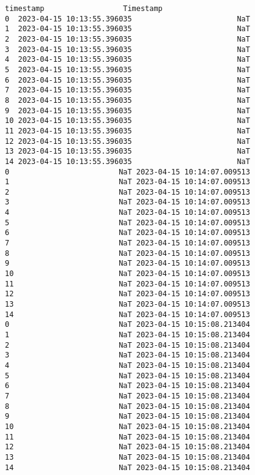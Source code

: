 \documentclass[11pt]{article}
\begin{document}
\begin{tcolorbox}[breakable, size=fbox, boxrule=.5pt, pad at break*=1mm, opacityfill=0]
\begin{Verbatim}[commandchars=\\\{\}]
                    timestamp                  Timestamp
0  2023-04-15 10:13:55.396035                        NaT
1  2023-04-15 10:13:55.396035                        NaT
2  2023-04-15 10:13:55.396035                        NaT
3  2023-04-15 10:13:55.396035                        NaT
4  2023-04-15 10:13:55.396035                        NaT
5  2023-04-15 10:13:55.396035                        NaT
6  2023-04-15 10:13:55.396035                        NaT
7  2023-04-15 10:13:55.396035                        NaT
8  2023-04-15 10:13:55.396035                        NaT
9  2023-04-15 10:13:55.396035                        NaT
10 2023-04-15 10:13:55.396035                        NaT
11 2023-04-15 10:13:55.396035                        NaT
12 2023-04-15 10:13:55.396035                        NaT
13 2023-04-15 10:13:55.396035                        NaT
14 2023-04-15 10:13:55.396035                        NaT
0                         NaT 2023-04-15 10:14:07.009513
1                         NaT 2023-04-15 10:14:07.009513
2                         NaT 2023-04-15 10:14:07.009513
3                         NaT 2023-04-15 10:14:07.009513
4                         NaT 2023-04-15 10:14:07.009513
5                         NaT 2023-04-15 10:14:07.009513
6                         NaT 2023-04-15 10:14:07.009513
7                         NaT 2023-04-15 10:14:07.009513
8                         NaT 2023-04-15 10:14:07.009513
9                         NaT 2023-04-15 10:14:07.009513
10                        NaT 2023-04-15 10:14:07.009513
11                        NaT 2023-04-15 10:14:07.009513
12                        NaT 2023-04-15 10:14:07.009513
13                        NaT 2023-04-15 10:14:07.009513
14                        NaT 2023-04-15 10:14:07.009513
0                         NaT 2023-04-15 10:15:08.213404
1                         NaT 2023-04-15 10:15:08.213404
2                         NaT 2023-04-15 10:15:08.213404
3                         NaT 2023-04-15 10:15:08.213404
4                         NaT 2023-04-15 10:15:08.213404
5                         NaT 2023-04-15 10:15:08.213404
6                         NaT 2023-04-15 10:15:08.213404
7                         NaT 2023-04-15 10:15:08.213404
8                         NaT 2023-04-15 10:15:08.213404
9                         NaT 2023-04-15 10:15:08.213404
10                        NaT 2023-04-15 10:15:08.213404
11                        NaT 2023-04-15 10:15:08.213404
12                        NaT 2023-04-15 10:15:08.213404
13                        NaT 2023-04-15 10:15:08.213404
14                        NaT 2023-04-15 10:15:08.213404
\end{Verbatim}
\end{tcolorbox}
        
\end{document}
